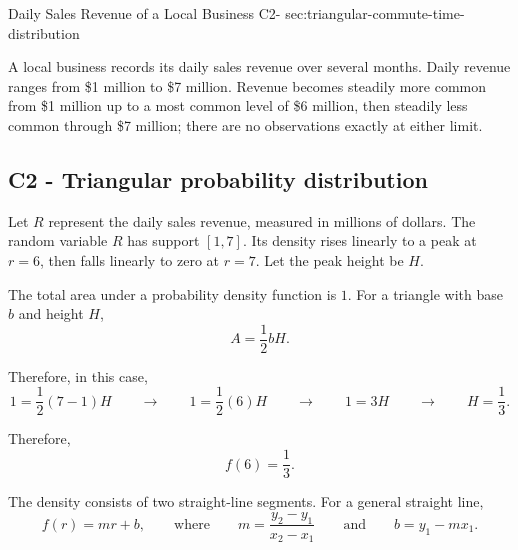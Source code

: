 	\sectionScored
	{Daily Sales Revenue of a Local Business}
	{C2-}
	{sec:triangular-commute-time-distribution}
	{
		A local business records its daily sales revenue over several months.
		Daily revenue ranges from \$1 million to \$7 million. Revenue becomes
		steadily more common from \$1 million up to a most common level of
		\$6 million, then steadily less common through \$7 million; there are
		no observations exactly at either limit.
		
		
		\label{subsec:triangular-commute-time-probabilities}
		\subsection*{C2 - Triangular probability distribution }
		
		Let \(R\) represent the daily sales revenue, measured in millions
		of dollars. The random variable \(R\) has support \([1,7]\).
		Its density rises linearly to a peak at \(r=6\), then falls
		linearly to zero at \(r=7\). Let the peak height be \(H\).
		
		
		The total area under a probability density function is \(1\).
		For a triangle with base \(b\) and height \(H\),
		\[
		A=\frac12 bH.
		\]
		
		Therefore, in this case,
		\[
		1
		=
		\frac12(7-1)H
		\qquad \rightarrow \qquad
		1
		=
		\frac12(6)H
		\qquad \rightarrow \qquad
		1=3H
		\qquad \rightarrow \qquad
		H=\frac13.
		\]
		
		Therefore,
		\[
		f(6)=\frac13.
		\]
		
		
			The density consists of two straight-line segments. For a general
			straight line,
			\[
			f(r)=mr+b,
			\qquad
			\text{where}
			\qquad
			m=\frac{y_2-y_1}{x_2-x_1}
			\qquad\text{and}\qquad
			b=y_1-mx_1.
			\]
			
}
